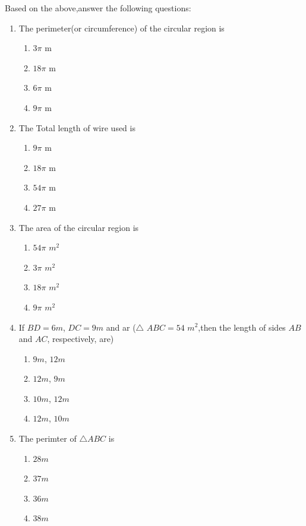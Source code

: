 \documentclass[11pt]{article}
\begin{document}
\begin{enumerate}
		Based on the above,answer the following questions:
		\begin{enumerate}[label=(\roman*)]
			\item The perimeter(or circumference) of the circular region is
				\begin{enumerate}[label=(\Alph*)]
					\item $3\pi$ m
					\item ${18}\pi$ m
					\item $6\pi$ m
					\item $9\pi$ m
				\end{enumerate}
			\item The Total length of wire used is
				\begin{enumerate}[label=(\Alph*)]
					\item $9\pi$ m
					\item ${18}\pi$ m
					\item ${54}\pi$ m
					\item ${27}\pi$ m
				\end{enumerate}
			\item The area of the circular region is
				\begin{enumerate}[label=(\Alph*)]
					\item ${54}\pi$ $m^2$
					\item ${3}\pi$ $m^2$
					\item ${18}\pi$ $m^2$
					\item ${9}\pi$ $m^2$
				\end{enumerate}
			\item If $BD = 6 m$, $DC = 9 m$ and ar ($\triangle$ $ABC = 54$ $m^2$,then the length of sides $AB$ and $AC$, respectively, are)
				\begin{enumerate}[label=(\Alph*)]
					\item $9 m$, $12 m$
					\item $12 m$, $9 m$
					\item $10 m$, $12 m$
					\item $12 m$, $10 m$
				\end{enumerate}
			\item The perimter of $\triangle ABC$ is
				\begin{enumerate}[label=(\Alph*)]
					\item $28 m$
					\item $37 m$
					\item $36 m$
					\item $38 m$
				\end{enumerate}
		\end{enumerate}		
\end{enumerate}
\end{document}
